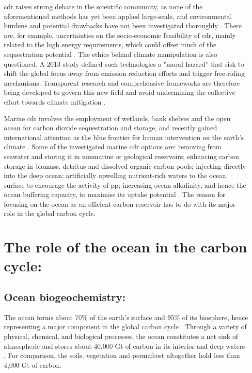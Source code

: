 \ac{cdr} raises strong debate in the scientific community, as none of the aforementioned methods has yet been applied large-scale, and environmental burdens and potential drawbacks have not been investigated thoroughly \citep{terlouw2021life}. There are, for example, uncertainties on the socio-economic feasibility of \ac{cdr}, mainly related to the high energy requirements, which could offset much of the  sequestration potential \citep{kheshgi1995sequestering}. The ethics behind climate manipulation is also questioned. A 2013 study defined such technologies a "moral hazard" that risk to shift the global focus away from emission reduction efforts \citep{preston2013ethics} and trigger free-riding mechanisms. Transparent research and comprehensive frameworks are therefore being developed to govern this new field and avoid undermining the collective effort towards climate mitigation \citep{honegger2021paying}. 

Marine \ac{cdr} involves the employment of wetlands, bank shelves and the open ocean for carbon dioxide sequestration and storage, and recently gained international attention as the blue frontier for human intervention on the earth's climate \citep{boettcher2021navigating}. Some of the investigated marine \ac{cdr} options are: removing  from seawater and storing it in nonmarine or geological reservoirs; enhancing carbon storage in biomass, detritus and dissolved organic carbon pools; injecting  directly into the deep ocean; artificially upwelling nutrient-rich waters to the ocean surface to encourage the activity of \ac{pp}; increasing ocean alkalinity, and hence the ocean buffering capacity, to maximise its uptake potential \citep{NAP26278}. The reason for focusing on the ocean as an efficient carbon reservoir has to do with its major role in the global carbon cycle.

\section{The role of the ocean in the carbon cycle:}

\subsection{Ocean biogeochemistry:}

The ocean forms about 70\% of the earth's surface and 95\% of its biosphere, hence representing a major component in the global carbon cycle \citep{ma2015primary}. Through a variety of physical, chemical, and biological processes, the ocean constitutes a net sink of atmospheric  and stores about 40,000 Gt of carbon in its interior and deep waters \citep{wang2023simulated}. For comparison, the soils, vegetation and permafrost altogether hold less than 4,000 Gt of carbon. 

